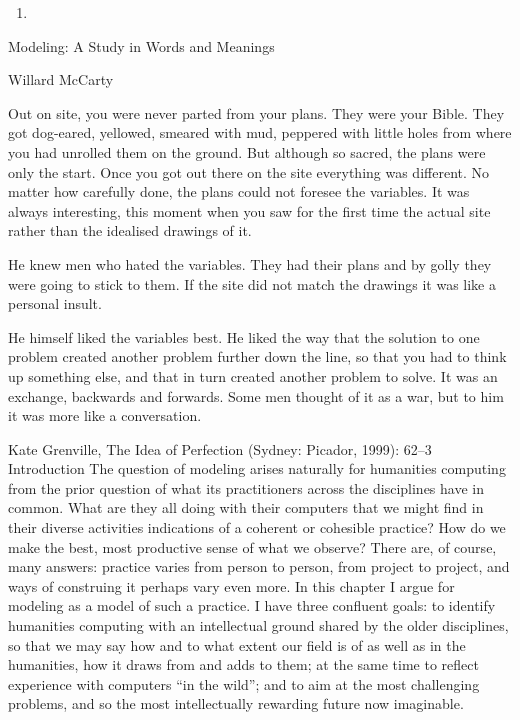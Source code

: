 \begin{enumerate}
\def\labelenumi{\arabic{enumi}.}
\setcounter{enumi}{18}
\tightlist
\item
\end{enumerate}

Modeling: A Study in Words and Meanings

Willard McCarty

Out on site, you were never parted from your plans. They were your
Bible. They got dog-eared, yellowed, smeared with mud, peppered with
little holes from where you had unrolled them on the ground. But
although so sacred, the plans were only the start. Once you got out
there on the site everything was different. No matter how carefully
done, the plans could not foresee the variables. It was always
interesting, this moment when you saw for the first time the actual site
rather than the idealised drawings of it.

He knew men who hated the variables. They had their plans and by golly
they were going to stick to them. If the site did not match the drawings
it was like a personal insult.

He himself liked the variables best. He liked the way that the solution
to one problem created another problem further down the line, so that
you had to think up something else, and that in turn created another
problem to solve. It was an exchange, backwards and forwards. Some men
thought of it as a war, but to him it was more like a conversation.

Kate Grenville, The Idea of Perfection (Sydney: Picador, 1999): 62--3
Introduction The question of modeling arises naturally for humanities
computing from the prior question of what its practitioners across the
disciplines have in common. What are they all doing with their computers
that we might find in their diverse activities indications of a coherent
or cohesible practice? How do we make the best, most productive sense of
what we observe? There are, of course, many answers: practice varies
from person to person, from project to project, and ways of construing
it perhaps vary even more. In this chapter I argue for modeling as a
model of such a practice. I have three confluent goals: to identify
humanities computing with an intellectual ground shared by the older
disciplines, so that we may say how and to what extent our field is of
as well as in the humanities, how it draws from and adds to them; at the
same time to reflect experience with computers ``in the wild''; and to
aim at the most challenging problems, and so the most intellectually
rewarding future now imaginable.

